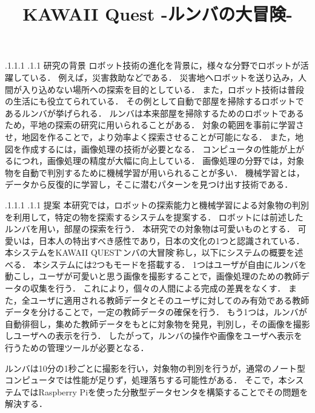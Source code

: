 \documentclass[a4paper, twocolumn]{jarticle}
\makeatletter
\def\section{\@startsection{section}{1}{\z@}%
 {.1\Cvs \@plus.1\Cdp \@minus.1\Cdp}%
 {.1\Cvs \@plus.1\Cdp}%
 {\normalfont\normalsize\bfseries}}
\makeatother
\begin{document}
\title{KAWAII Quest -ルンバの大冒険-}
\date{}
\maketitle
\thispagestyle{empty}

\section{研究の背景}
ロボット技術の進化を背景に，様々な分野でロボットが活躍している．
例えば，災害救助などである．
災害地へロボットを送り込み，人間が入り込めない場所への探索を目的としている．
また，ロボット技術は普段の生活にも役立てられている．
その例として自動で部屋を掃除するロボットであるルンバが挙げられる．
ルンバは本来部屋を掃除するためのロボットであるため，平地の探索の研究に用いられることがある．
対象の範囲を事前に学習させ，地図を作ることで，より効率よく探索させることが可能になる．
また，地図を作成するには，画像処理の技術が必要となる．
コンピュータの性能が上がるにつれ，画像処理の精度が大幅に向上している．
画像処理の分野では，対象物を自動で判別するために機械学習が用いられることが多い．
機械学習とは，データから反復的に学習し，そこに潜むパターンを見つけ出す技術である．

\section{提案}
本研究では，ロボットの探索能力と機械学習による対象物の判別を利用して，特定の物を探索するシステムを提案する．
ロボットには前述したルンバを用い，部屋の探索を行う．
本研究での対象物は可愛いものとする．
可愛いは，日本人の特出すべき感性であり，日本の文化の1つと認識されている．
本システムをKAWAII QUEST\~ルンバの大冒険\~と称し，以下にシステムの概要を述べる．
本システムには2つもモードを搭載する．
1つはユーザが自由にルンバを動こし，ユーザが可愛いと思う画像を撮影することで，画像処理のための教師データの収集を行う．
これにより，個々の人間による完成の差異をなくす．
また，全ユーザに適用される教師データとそのユーザに対してのみ有効である教師データを分けることで，一定の教師データの確保を行う．
もう1つは，ルンバが自動徘徊し，集めた教師データをもとに対象物を発見，判別し，その画像を撮影しユーザへの表示を行う．
したがって，ルンバの操作や画像をユーザへ表示を行うための管理ツールが必要となる．

ルンバは10分の1秒ごとに撮影を行い，対象物の判別を行うが，通常のノート型コンピュータでは性能が足りず，処理落ちする可能性がある．
そこで，本システムではRaspberry Piを使った分散型データセンタを構築することでその問題を解決する．
\end{document}
